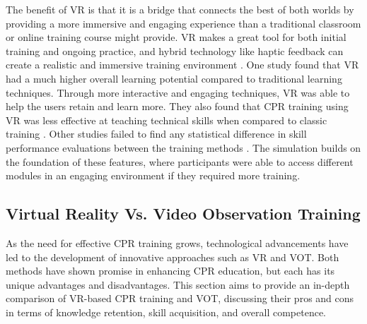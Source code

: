 \documentclass[manuscript]{./Models/acmart}
\begin{document}
The benefit of VR is that it is a bridge that connects the best of both worlds by providing a more immersive and engaging experience than a traditional classroom or online training course might provide. VR makes a great tool for both initial training and ongoing practice, and hybrid technology like haptic feedback can create a realistic and immersive training environment \cite{almousa-2019}. One study found that VR had a much higher overall learning potential compared to traditional learning techniques. Through more interactive and engaging techniques, VR was able to help the users retain and learn more. They also found that CPR training using VR was less effective at teaching technical skills when compared to classic training \cite{issleib-2021}. Other studies failed to find any statistical difference in skill performance evaluations between the training methods \cite{hubail-2022}. The simulation builds on the foundation of these features, where participants were able to access different modules in an engaging environment if they required more training.

\subsection{Virtual Reality Vs. Video Observation Training}
As the need for effective CPR training grows, technological advancements have led to the development of innovative approaches such as VR and VOT. Both methods have shown promise in enhancing CPR education, but each has its unique advantages and disadvantages. This section aims to provide an in-depth comparison of VR-based CPR training and VOT, discussing their pros and cons in terms of knowledge retention, skill acquisition, and overall competence. 
\end{document}
